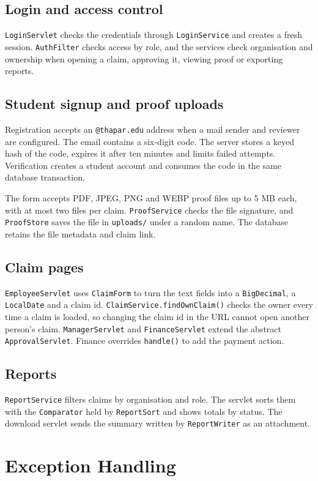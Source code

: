 \documentclass[12pt,a4paper]{report}
\begin{document}
\subsection*{Login and access control}
\texttt{LoginServlet} checks the credentials through \texttt{LoginService} and creates a fresh session. \texttt{AuthFilter} checks access by role, and the services check organisation and ownership when opening a claim, approving it, viewing proof or exporting reports.

\subsection*{Student signup and proof uploads}
Registration accepts an \texttt{@thapar.edu} address when a mail sender and reviewer are configured. The email contains a six-digit code. The server stores a keyed hash of the code, expires it after ten minutes and limits failed attempts. Verification creates a student account and consumes the code in the same database transaction.

The form accepts PDF, JPEG, PNG and WEBP proof files up to 5 MB each, with at most two files per claim. \texttt{ProofService} checks the file signature, and \texttt{ProofStore} saves the file in \texttt{uploads/} under a random name. The database retains the file metadata and claim link.

\subsection*{Claim pages}
\texttt{EmployeeServlet} uses \texttt{ClaimForm} to turn the text fields into a \texttt{BigDecimal}, a \texttt{LocalDate} and a claim id. \texttt{ClaimService.findOwnClaim()} checks the owner every time a claim is loaded, so changing the claim id in the URL cannot open another person's claim. \texttt{ManagerServlet} and \texttt{FinanceServlet} extend the abstract \texttt{ApprovalServlet}. Finance overrides \texttt{handle()} to add the payment action.

\subsection*{Reports}
\texttt{ReportService} filters claims by organisation and role. The servlet sorts them with the \texttt{Comparator} held by \texttt{ReportSort} and shows totals by status. The download servlet sends the summary written by \texttt{ReportWriter} as an attachment.

\section{Exception Handling}
\end{document}
